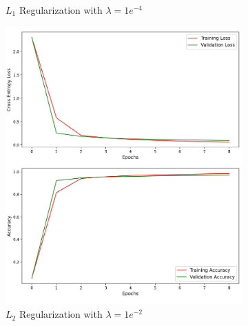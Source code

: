 \begin{figure}[H]
\begin{subfigure}{0.5\textwidth}
		\caption{$L_1$ Regularization with $\lambda = 1e^{-4}$}
		\label{fig:l1_1e4}
	\end{subfigure}

	\begin{subfigure}{0.5\textwidth}
		\centering
		\includegraphics[width=1.0\textwidth]{./images/l2_e2.png}
		\caption{$L_2$ Regularization with $\lambda = 1e^{-2}$}
		\label{fig:l2_1e2}
	\end{subfigure}
	\begin{subfigure}{0.5\textwidth}
		\centering

\end{subfigure}
\end{figure}
